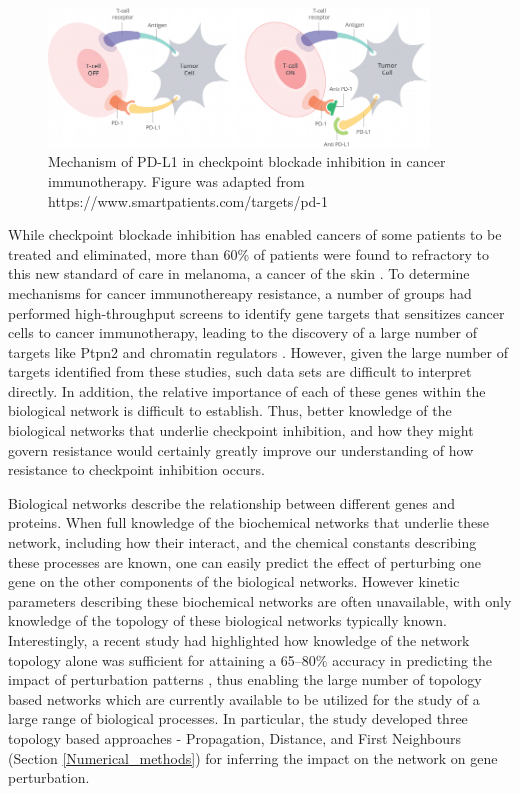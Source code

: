 \documentclass{article}
\begin{document}
\begin{figure}
    \includegraphics[width = 0.9\textwidth]{Images/pd1-pathway-cb3f6ea987e660555dd535e0223a6a05.png}
    \caption{Mechanism of PD-L1 in checkpoint blockade inhibition in cancer immunotherapy. Figure was adapted from https://www.smartpatients.com/targets/pd-1}
    \label{fig:PDL1_schematic}
\end{figure}




While checkpoint blockade inhibition has enabled cancers of some patients to be treated and eliminated, more than 60\% of patients were found to refractory to this new standard of care in melanoma, a cancer of the skin \cite{ribas2016association}.  To determine mechanisms for cancer immunothereapy resistance, a number of groups had performed high-throughput screens to identify gene targets that sensitizes cancer cells to cancer immunotherapy, leading to the discovery of a large number of targets like Ptpn2 and chromatin regulators \cite{patel2017identification, manguso2017vivo, pan2018major}. However, given the large number of targets identified from these studies, such data sets are difficult to interpret directly. In addition, the relative importance of each of these genes within the biological network is difficult to establish. Thus, better knowledge of the biological networks that underlie checkpoint inhibition, and how they might govern resistance would certainly greatly improve our understanding of how resistance to checkpoint inhibition occurs.

Biological networks describe the relationship between different genes and proteins. When full knowledge of the biochemical networks that underlie these network, including how their interact, and the chemical constants describing these processes are known, one can easily predict the effect of perturbing one gene on the other components of the biological networks. However kinetic parameters describing these biochemical networks are often unavailable, with only knowledge of the topology of these biological networks typically known. Interestingly, a recent study had highlighted how knowledge of the network topology alone was sufficient for attaining a 65–80\% accuracy in predicting the impact of perturbation patterns \cite{SantoliniE6375}, thus enabling the large number of topology based networks which are currently available to be utilized for the study of a large range of biological processes. In particular, the study developed three topology based approaches - Propagation, Distance, and First Neighbours (Section \ref{Numerical_methods}) for inferring the impact on the network on gene perturbation. 
\end{document}

